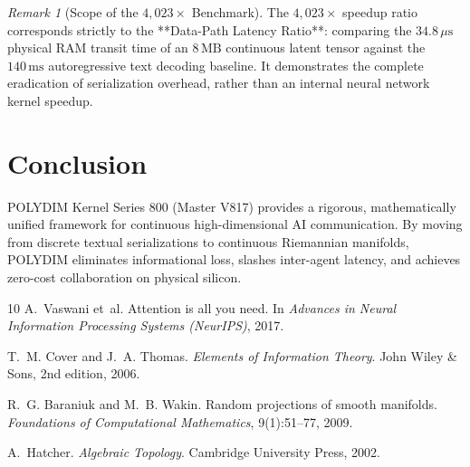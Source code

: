 \documentclass[11pt,twoside,a4paper]{article}
\theoremstyle{plain}
\theoremstyle{definition}
\theoremstyle{remark}
\newtheorem{remark}[theorem]{Remark}
\begin{document}
\begin{remark}[Scope of the $4,023\times$ Benchmark]
The $4,023\times$ speedup ratio corresponds strictly to the **Data-Path Latency Ratio**: comparing the $34.8\,\mu\text{s}$ physical RAM transit time of an $8\,\text{MB}$ continuous latent tensor against the $140\,\text{ms}$ autoregressive text decoding baseline. It demonstrates the complete eradication of serialization overhead, rather than an internal neural network kernel speedup.
\end{remark}

\section{Conclusion}
\label{sec:conclusion}

POLYDIM Kernel Series 800 (Master V817) provides a rigorous, mathematically unified framework for continuous high-dimensional AI communication. By moving from discrete textual serializations to continuous Riemannian manifolds, POLYDIM eliminates informational loss, slashes inter-agent latency, and achieves zero-cost collaboration on physical silicon.


\begin{thebibliography}{10}
A.~Vaswani et~al.
\newblock Attention is all you need.
\newblock In \emph{Advances in Neural Information Processing Systems (NeurIPS)}, 2017.

T.~M. Cover and J.~A. Thomas.
\newblock \emph{Elements of Information Theory}.
\newblock John Wiley \& Sons, 2nd edition, 2006.

R.~G. Baraniuk and M.~B. Wakin.
\newblock Random projections of smooth manifolds.
\newblock \emph{Foundations of Computational Mathematics}, 9(1):51--77, 2009.

A.~Hatcher.
\newblock \emph{Algebraic Topology}.
\newblock Cambridge University Press, 2002.
\end{thebibliography}
\end{document}
